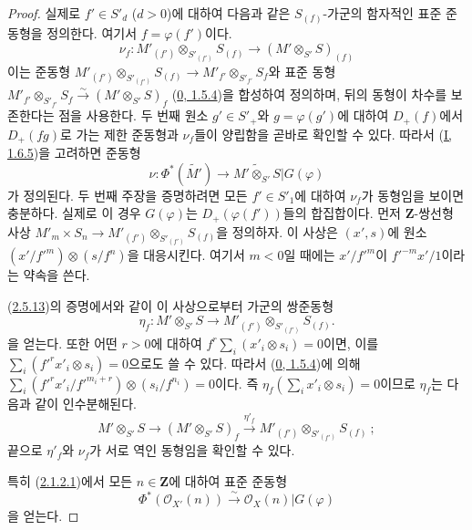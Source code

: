 \begin{proof}
실제로 $f'\in S'_d$ ($d>0$)에 대하여 다음과 같은
$S_{(f)}$-가군의 함자적인 표준 준동형을 정의한다. 여기서
$f=\varphi(f')$이다.
\[
\label{II.2.8.8.1-ko}
  \nu_f:M'_{(f')}\otimes_{S'_{(f')}}S_{(f)}
  \longrightarrow(M'\otimes_{S'}S)_{(f)}
\tag{2.8.8.1}
\]
이는 준동형
$M'_{(f')}\otimes_{S'_{(f')}}S_{(f)}\to
M'_{f'}\otimes_{S'_{f'}}S_f$와 표준 동형
$M'_{f'}\otimes_{S'_{f'}}S_f\xrightarrow{\sim}(M'\otimes_{S'}S)_f$
(\hyperref[0.1.5.4-ko]{0, 1.5.4})을 합성하여 정의하며, 뒤의 동형이
차수를 보존한다는 점을 사용한다. 두 번째 원소 $g'\in S'_+$와
$g=\varphi(g')$에 대하여 $D_+(f)$에서 $D_+(fg)$로 가는 제한
준동형과 $\nu_f$들이 양립함을 곧바로 확인할 수 있다. 따라서
(\hyperref[I.1.6.5-ko]{I, 1.6.5})을 고려하면 준동형
\[
  \nu:\Phi^*(\widetilde{M'})
  \longrightarrow\widetilde{M'\otimes_{S'}S}|G(\varphi)
\]
가 정의된다. 두 번째 주장을 증명하려면 모든 $f'\in S'_1$에 대하여
$\nu_f$가 동형임을 보이면 충분하다. 실제로 이 경우 $G(\varphi)$는
$D_+(\varphi(f'))$들의 합집합이다. 먼저 $\mathbf{Z}$-쌍선형 사상
$M'_m\times S_n\to M'_{(f')}\otimes_{S'_{(f')}}S_{(f)}$을 정의하자.
이 사상은 $(x',s)$에 원소
$(x'/{f'}^m)\otimes(s/f^n)$을 대응시킨다. 여기서 $m<0$일 때에는
$x'/{f'}^m$이 ${f'}^{-m}x'/1$이라는 약속을 쓴다.

(\hyperref[II.2.5.13-ko]{2.5.13})의 증명에서와 같이 이 사상으로부터
가군의 쌍준동형
\[
  \eta_f:M'\otimes_{S'}S
  \longrightarrow M'_{(f')}\otimes_{S'_{(f')}}S_{(f)}.
\]
을 얻는다. 또한 어떤 $r>0$에 대하여
$f^r\sum_i(x'_i\otimes s_i)=0$이면, 이를
$\sum_i({f'}^rx'_i\otimes s_i)=0$으로도 쓸 수 있다. 따라서
(\hyperref[0.1.5.4-ko]{0, 1.5.4})에 의해
$\sum_i({f'}^rx'_i/{f'}^{m_i+r})\otimes(s_i/f^{n_i})=0$이다. 즉
$\eta_f(\sum_i x'_i\otimes s_i)=0$이므로 $\eta_f$는 다음과 같이
인수분해된다.
\[
  M'\otimes_{S'}S\longrightarrow(M'\otimes_{S'}S)_f
  \xrightarrow{\eta'_f}M'_{(f')}\otimes_{S'_{(f')}}S_{(f)}~;
\]
끝으로 $\eta'_f$와 $\nu_f$가 서로 역인 동형임을 확인할 수 있다.

특히 (\hyperref[II.2.1.2.1-ko]{2.1.2.1})에서 모든
$n\in\mathbf{Z}$에 대하여 표준 준동형
\[
\label{II.2.8.8.2-ko}
  \Phi^*(\mathcal{O}_{X'}(n))\xrightarrow{\sim}
  \mathcal{O}_X(n)|G(\varphi)
\tag{2.8.8.2}
\]
을 얻는다.
\end{proof}

